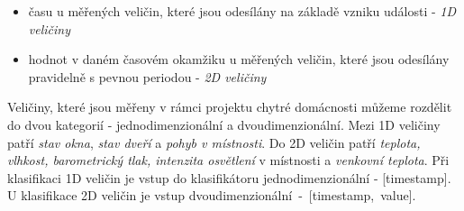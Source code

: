 \begin{itemize}
	\item času u měřených veličin, které jsou odesílány na základě vzniku události - \textit{1D veličiny}
	\item hodnot v daném časovém okamžiku u měřených veličin, které jsou odesílány pravidelně s pevnou periodou - \textit{2D veličiny}
\end{itemize}

Veličiny, které jsou měřeny v rámci projektu chytré domácnosti můžeme rozdělit do dvou kategorií - jednodimenzionální a dvoudimenzionální. Mezi 1D veličiny patří \textit{stav okna}, \textit{stav dveří} a \textit{pohyb v místnosti}. Do 2D veličin patří \textit{teplota, vlhkost, barometrický tlak, intenzita osvětlení} v místnosti a \textit{venkovní teplota}. Při klasifikaci 1D veličin je vstup do klasifikátoru jednodimenzionální - [timestamp]. U klasifikace 2D veličin je vstup \mbox{dvoudimenzionální - [timestamp, value].} 

